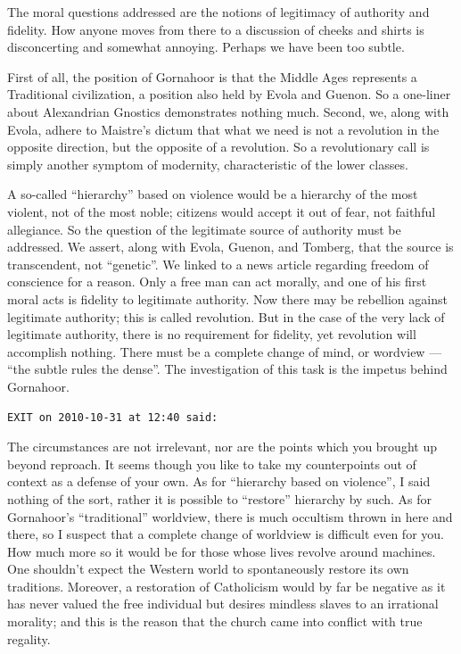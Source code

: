 \begin{footnotesize}
\begin{sffamily}
The moral questions addressed are the notions of legitimacy of authority and fidelity. How anyone moves from there to a discussion of cheeks and shirts is disconcerting and somewhat annoying. Perhaps we have been too subtle.

First of all, the position of Gornahoor is that the Middle Ages represents a Traditional civilization, a position also held by Evola and Guenon. So a one-liner about Alexandrian Gnostics demonstrates nothing much. Second, we, along with Evola, adhere to Maistre's dictum that what we need is not a revolution in the opposite direction, but the opposite of a revolution. So a revolutionary call is simply another symptom of modernity, characteristic of the lower classes.

A so-called ``hierarchy'' based on violence would be a hierarchy of the most violent, not of the most noble; citizens would accept it out of fear, not faithful allegiance. So the question of the legitimate source of authority must be addressed. We assert, along with Evola, Guenon, and Tomberg, that the source is transcendent, not ``genetic''. We linked to a news article regarding freedom of conscience for a reason. Only a free man can act morally, and one of his first moral acts is fidelity to legitimate authority. Now there may be rebellion against legitimate authority; this is called revolution. But in the case of the very lack of legitimate authority, there is no requirement for fidelity, yet revolution will accomplish nothing. There must be a complete change of mind, or wordview --- ``the subtle rules the dense''. The investigation of this task is the impetus behind Gornahoor.

\hfill

\texttt{EXIT on 2010-10-31 at 12:40 said:}

The circumstances are not irrelevant, nor are the points which you brought up beyond reproach. It seems though you like to take my counterpoints out of context as a defense of your own. As for ``hierarchy based on violence'', I said nothing of the sort, rather it is possible to ``restore'' hierarchy by such. As for Gornahoor's ``traditional'' worldview, there is much occultism thrown in here and there, so I suspect that a complete change of worldview is difficult even for you. How much more so it would be for those whose lives revolve around machines. One shouldn't expect the Western world to spontaneously restore its own traditions. Moreover, a restoration of Catholicism would by far be negative as it has never valued the free individual but desires mindless slaves to an irrational morality; and this is the reason that the church came into conflict with true regality.


\end{sffamily}
\end{footnotesize}
